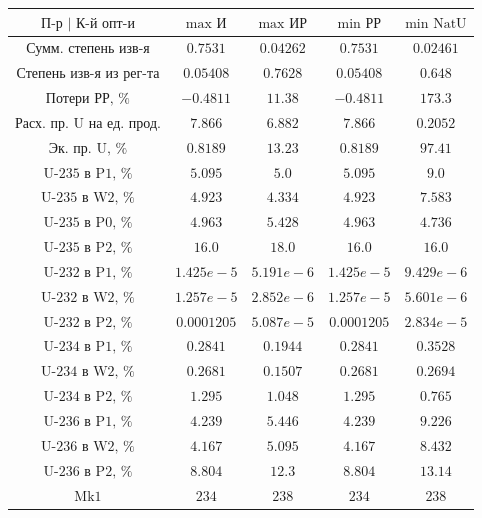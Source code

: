 \begin{table}
    \begin{tabular}{ccccc}
        $\text{П-р | К-й опт-и}$ & $\text{max И}$ & $\text{max ИР}$ & $\text{min РР}$ & $\text{min NatU}$\\ \hline
        $\text{Сумм. степень изв-я}$ & $0.7531$ & $0.04262$ & $0.7531$ & $0.02461$\\ \hline
        $\text{Степень изв-я из рег-та}$ & $0.05408$ & $0.7628$ & $0.05408$ & $0.648$\\ \hline
        $\text{Потери РР, \%}$ & $-0.4811$ & $11.38$ & $-0.4811$ & $173.3$\\ \hline
        $\text{Расх. пр. U на ед. прод.}$ & $7.866$ & $6.882$ & $7.866$ & $0.2052$\\ \hline
        $\text{Эк. пр. U, \%}$ & $0.8189$ & $13.23$ & $0.8189$ & $97.41$\\ \hline
        $\text{U-235 в P1, \%}$ & $5.095$ & $5.0$ & $5.095$ & $9.0$\\ \hline
        $\text{U-235 в W2, \%}$ & $4.923$ & $4.334$ & $4.923$ & $7.583$\\ \hline
        $\text{U-235 в P0, \%}$ & $4.963$ & $5.428$ & $4.963$ & $4.736$\\ \hline
        $\text{U-235 в P2, \%}$ & $16.0$ & $18.0$ & $16.0$ & $16.0$\\ \hline
        $\text{U-232 в P1, \%}$ & $1.425e-5$ & $5.191e-6$ & $1.425e-5$ & $9.429e-6$\\ \hline
        $\text{U-232 в W2, \%}$ & $1.257e-5$ & $2.852e-6$ & $1.257e-5$ & $5.601e-6$\\ \hline
        $\text{U-232 в P2, \%}$ & $0.0001205$ & $5.087e-5$ & $0.0001205$ & $2.834e-5$\\ \hline
        $\text{U-234 в P1, \%}$ & $0.2841$ & $0.1944$ & $0.2841$ & $0.3528$\\ \hline
        $\text{U-234 в W2, \%}$ & $0.2681$ & $0.1507$ & $0.2681$ & $0.2694$\\ \hline
        $\text{U-234 в P2, \%}$ & $1.295$ & $1.048$ & $1.295$ & $0.765$\\ \hline
        $\text{U-236 в P1, \%}$ & $4.239$ & $5.446$ & $4.239$ & $9.226$\\ \hline
        $\text{U-236 в W2, \%}$ & $4.167$ & $5.095$ & $4.167$ & $8.432$\\ \hline
        $\text{U-236 в P2, \%}$ & $8.804$ & $12.3$ & $8.804$ & $13.14$\\ \hline
        $\text{Mk1}$ & $234$ & $238$ & $234$ & $238$\\ \hline

\end{tabular}
\end{table}
